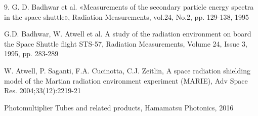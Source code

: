 \documentclass[12pt,a4paper]{report} %
\begin{document}
\begin{thebibliography}{00}
9.	G. D. Badhwar et al. «Measurements of the secondary particle energy spectra in the space shuttle», Radiation Measurements, vol.24, No.2, pp. 129-138, 1995

G.D. Badhwar, W. Atwell et al. A study of the radiation environment on board the Space Shuttle flight STS-57, Radiation Measurements, Volume 24, Issue 3, 1995, pp. 283-289

W. Atwell, P. Saganti, F.A. Cucinotta, C.J. Zeitlin, A space radiation shielding model of the Martian radiation environment experiment (MARIE), Adv Space Res. 2004;33(12):2219-21

Photomultiplier Tubes and related products, Hamamatsu Photonics, 2016
\end{thebibliography}
\end{document}
